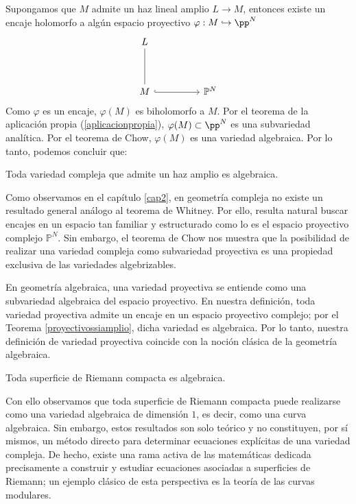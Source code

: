 	Supongamos que $M$ admite un haz lineal amplio $L\longrightarrow M$, entonces existe un encaje holomorfo a algún espacio proyectivo $\varphi:M\hookrightarrow\pp^N$
	\[\begin{tikzcd}
		L \\
		\\
		M && {\mathbb{P}^N}
		\arrow[no head, from=1-1, to=3-1]
		\arrow[hook, from=3-1, to=3-3]
	\end{tikzcd}\]
	Como $\varphi$ es un encaje, $\varphi(M)$ es biholomorfo a $M$. Por el teorema de la aplicación propia (\ref{aplicacionpropia}), $\varphi(M)\subset\pp^N$ es una subvariedad analítica. Por el teorema de Chow, $\varphi(M)$ es una variedad algebraica. Por lo tanto, podemos concluir que:

\begin{corollary}
	Toda variedad compleja que admite un haz amplio es algebraica.
\end{corollary}

	Como observamos en el capítulo \ref{cap2}, en geometría compleja no existe un resultado general análogo al teorema de Whitney. Por ello, resulta natural buscar encajes en un espacio tan familiar y estructurado como lo es el espacio proyectivo complejo \(\mathbb{P}^N\). Sin embargo, el teorema de Chow nos muestra que la posibilidad de realizar una variedad compleja como subvariedad proyectiva es una propiedad exclusiva de las variedades algebrizables.
	
	En geometría algebraica, una variedad proyectiva se entiende como una subvariedad algebraica del espacio proyectivo. En nuestra definición, toda variedad proyectiva admite un encaje en un espacio proyectivo complejo; por el Teorema \ref{proyectivossiamplio}, dicha variedad es algebraica. Por lo tanto, nuestra definición de variedad proyectiva coincide con la noción clásica de la geometría algebraica.

	\begin{corollary}\label{teoriemann}
		Toda superficie de Riemann compacta es algebraica.
	\end{corollary}
	
	Con ello observamos que toda superficie de Riemann compacta puede realizarse como una variedad algebraica de dimensión $1$, es decir, como una curva algebraica. Sin embargo, estos resultados son solo teórico y no constituyen, por sí mismos, un método directo para determinar ecuaciones explícitas de una variedad compleja. De hecho, existe una rama activa de las matemáticas dedicada precisamente a construir y estudiar ecuaciones asociadas a superficies de Riemann; un ejemplo clásico de esta perspectiva es la teoría de las curvas modulares.
	
